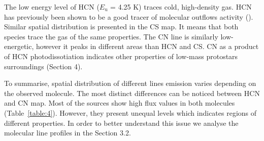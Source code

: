 \documentclass{aa}
\begin{document}
The low energy level of HCN ($E_\mathrm{u}$ = 4.25 K) traces cold, high-density gas. HCN has previously been shown to be a good tracer of molecular outflows activity (\cite{Wal14}). Similar spatial distribution is presented in the CS map. It means that both species trace the gas of the same properties. The CN line is similarly low-energetic, however it peaks in different areas than HCN and CS. CN as a product of HCN photodissotiation indicates other properties of low-mass protostars surroundings (Section 4).

To summarise, spatial distribution of different lines emission varies depending on the observed molecule. The most distinct differences can be noticed between HCN and CN map. Most of the sources show high flux values in both molecules (Table~\ref{table:4}). However, they present unequal levels which indicates regions of different properties. In order to better understand this issue we analyse the molecular line profiles in the Section 3.2. 
\end{document}
